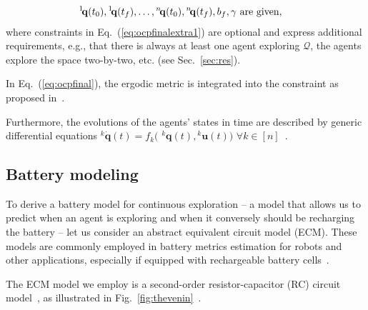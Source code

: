\documentclass[letterpaper,10pt,conference,twoside]{IEEEtran}
\theoremstyle{definition}
\begin{document}
\begin{subequations}
\begin{align}
  {}^1\hspace*{-.4ex}\mathbf{q}&(t_0),{}^1\hspace*{-.4ex}\mathbf{q}(t_f),\dots,{}^n\hspace*{-.4ex}\mathbf{q}(t_0),{}^n\hspace*{-.4ex}\mathbf{q}(t_f),b_f,\gamma\text{ are given},\label{eq:ocpgivenconst}
\end{align}\end{subequations}
where constraints in Eq.~(\ref{eq:ocpfinalextra1}) are optional and express additional requirements, e.g., that there is always at least one agent exploring $\mathcal{Q}$, the agents explore the space two-by-two, etc. (see Sec.~\ref{sec:res}).

In Eq.~(\ref{eq:ocpfinal}), the ergodic metric is integrated into the constraint as proposed in~\cite{dong2023time}. 

Furthermore, the evolutions of the agents' states in time are described by generic differential equations ${}^k\dot{\mathbf{q}}(t)=f_k($ ${}^k\mathbf{q}(t),{}^k\mathbf{u}(t))$ $\forall k\in[n]$~\cite{abraham2018decentralized}.


\subsection{Battery modeling}\label{sec:batt}
\noindent
To derive a battery model for continuous exploration -- a model that allows us to predict when an agent is exploring and when it conversely should be recharging the battery -- let us consider an abstract equivalent circuit model (ECM). These models are commonly employed in battery metrics estimation for robots and other applications, especially if equipped with rechargeable battery cells~\cite{zhang2018online,xiaosong2012comparative,hasan2018exogenous,hinz2019comparison,mousavi2014various,seewald2022energy}.

The ECM model we employ is a second-order resistor-capacitor (RC) circuit model~\cite{zhao2017observability}, as illustrated in Fig.~\ref{fig:thevenin}~\cite{seewaldphdthesis}. 
\end{document}

